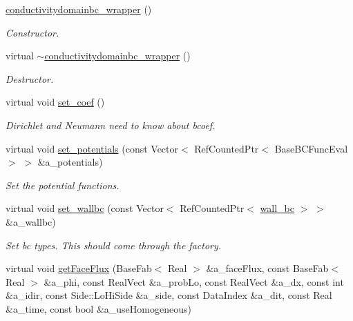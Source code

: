 \begin{DoxyCompactItemize}
\item 
\hyperlink{classconductivitydomainbc__wrapper_afa161525b82294f1fa0eb18b036fd71e}{conductivitydomainbc\+\_\+wrapper} ()
\begin{DoxyCompactList}\small\item\em Constructor. \end{DoxyCompactList}\item 
virtual \hyperlink{classconductivitydomainbc__wrapper_a57f31b41c819197fc55b502d7c396223}{$\sim$conductivitydomainbc\+\_\+wrapper} ()
\begin{DoxyCompactList}\small\item\em Destructor. \end{DoxyCompactList}\item 
virtual void \hyperlink{classconductivitydomainbc__wrapper_a2a50f77ec3e6b578dcc1f8be49bbca58}{set\+\_\+coef} ()
\begin{DoxyCompactList}\small\item\em Dirichlet and Neumann need to know about bcoef. \end{DoxyCompactList}\item 
virtual void \hyperlink{classconductivitydomainbc__wrapper_a061c50c197cc0ef1db9076dda2491c5c}{set\+\_\+potentials} (const Vector$<$ Ref\+Counted\+Ptr$<$ Base\+B\+C\+Func\+Eval $>$ $>$ \&a\+\_\+potentials)
\begin{DoxyCompactList}\small\item\em Set the potential functions. \end{DoxyCompactList}\item 
virtual void \hyperlink{classconductivitydomainbc__wrapper_a43711527043613d36377500c11ece7dc}{set\+\_\+wallbc} (const Vector$<$ Ref\+Counted\+Ptr$<$ \hyperlink{classwall__bc}{wall\+\_\+bc} $>$ $>$ \&a\+\_\+wallbc)
\begin{DoxyCompactList}\small\item\em Set bc types. This should come through the factory. \end{DoxyCompactList}\item 
virtual void \hyperlink{classconductivitydomainbc__wrapper_a6e0b7858078e5f16b9d9d3945ac67d8e}{get\+Face\+Flux} (Base\+Fab$<$ Real $>$ \&a\+\_\+face\+Flux, const Base\+Fab$<$ Real $>$ \&a\+\_\+phi, const Real\+Vect \&a\+\_\+prob\+Lo, const Real\+Vect \&a\+\_\+dx, const int \&a\+\_\+idir, const Side\+::\+Lo\+Hi\+Side \&a\+\_\+side, const Data\+Index \&a\+\_\+dit, const Real \&a\+\_\+time, const bool \&a\+\_\+use\+Homogeneous)

\end{DoxyCompactItemize}
